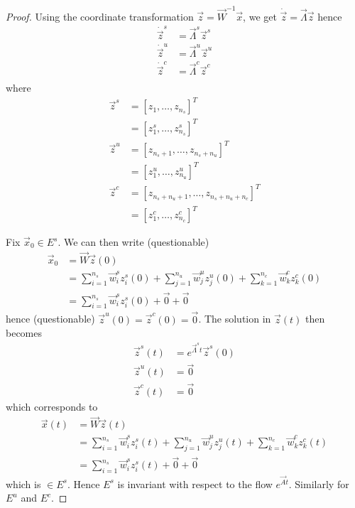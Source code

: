 \begin{proof}
	Using the coordinate transformation $\vec z = \vec W^{-1} \vec x$, we get $\dot{\vec z} = \vec \Lambda \vec z$ hence
	\begin{align*}
		\dot{\vec z}^s &= \vec \Lambda^s \vec z^s \\
		\dot{\vec z}^u &= \vec \Lambda^u \vec z^u \\
		\dot{\vec z}^c &= \vec \Lambda^c \vec z^c \\
	\end{align*}
	where
	\begin{align*}
		\vec z^s 	&= [z_1, \dotsc, z_{n_s}]^T \\
					&= [z_1^s, \dotsc, z_{n_s}^s]^T \\
		\vec z^u 	&= [z_{n_s + 1}, \dotsc, z_{n_s + n_u}]^T \\
					&= [z_1^u, \dotsc, z_{n_u}^u]^T \\
		\vec z^c 	&= [z_{n_s + n_u + 1}, \dotsc, z_{n_s + n_u + n_c}]^T \\
					&= [z_1^c, \dotsc, z_{n_c}^c]^T 
	\end{align*}

	Fix $\vec x_0 \in E^s$. We can then write (questionable)
	\begin{align*}
		\vec x_0 	&= \vec W \vec z(0) \\
					&= \sum_{i = 1}^{n_s} \vec w_i^s z_i^s(0) + \sum_{j = 1}^{n_u} \vec w_j^u z_j^u(0) + \sum_{k = 1}^{n_c} \vec w_k^c z_k^c(0) \\
					&= \sum_{i = 1}^{n_s} \vec w_i^s z_i^s(0) + \vec 0 + \vec 0
	\end{align*}
	hence (questionable) $\vec z^u(0) = \vec z^c(0) = \vec 0$. The solution in $\vec z(t)$ then becomes
	\begin{align*}
		\vec z^s(t) &= e^{\vec \Lambda^s t} \vec z^s(0) \\
		\vec z^u(t) &= \vec 0 \\
		\vec z^c(t) &= \vec 0
	\end{align*}
	which corresponds to
	\begin{align*}
		\vec x(t) 	&= \vec W \vec z(t) \\
					&= \sum_{i = 1}^{n_s} \vec w_i^s z_i^s(t) + \sum_{j = 1}^{n_u} \vec w_j^u z_j^u(t) + \sum_{k = 1}^{n_c} \vec w_k^c z_k^c(t) \\
					&= \sum_{i = 1}^{n_s} \vec w_i^s z_i^s(t) + \vec 0 + \vec 0
	\end{align*}
	which is $\in E^s$. Hence $E^s$ is invariant with respect to the flow $e^{\vec At}$. Similarly for $E^u$ and $E^c$.
\end{proof}

